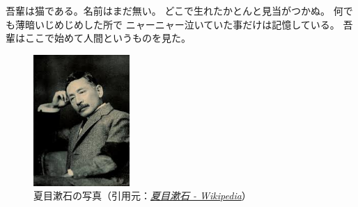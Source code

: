 \documentclass[uplatex]{jsarticle}
\newcommand{\linedhref}[2]{\href{#1}{\emph{#2}}}
\begin{document}
吾輩は猫である。名前はまだ無い\cite{Soseki1905}。
どこで生れたかとんと見当がつかぬ。
何でも薄暗いじめじめした所で
ニャーニャー泣いていた事だけは記憶している。
吾輩はここで始めて人間というものを見た。

\begin{figure}[H]
    \begin{center}
      \includegraphics[height=5cm]{img/natsume_soseki.jpeg}
      \caption{夏目漱石の写真（引用元：\linedhref{https://ja.wikipedia.org/wiki/\%E5\%A4\%8F\%E7\%9B\%AE\%E6\%BC\%B1\%E7\%9F\%B3}{夏目漱石 - Wikipedia}）}
    \end{center}
\end{figure}



\end{document}
